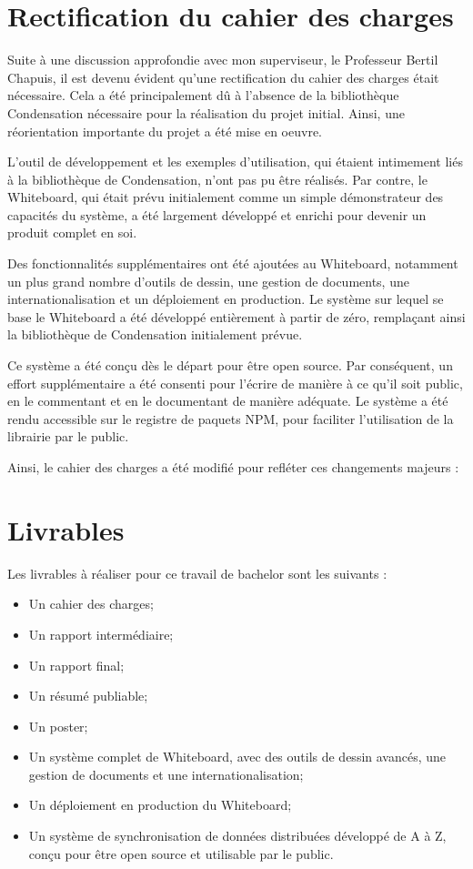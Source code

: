 \section*{Rectification du cahier des charges}

Suite à une discussion approfondie avec mon superviseur, le Professeur Bertil Chapuis, il est devenu évident qu'une rectification du cahier des charges était nécessaire. Cela a été principalement dû à l'absence de la bibliothèque Condensation nécessaire pour la réalisation du projet initial. Ainsi, une réorientation importante du projet a été mise en oeuvre.

L'outil de développement et les exemples d'utilisation, qui étaient intimement liés à la bibliothèque de Condensation, n'ont pas pu être réalisés. Par contre, le Whiteboard, qui était prévu initialement comme un simple démonstrateur des capacités du système, a été largement développé et enrichi pour devenir un produit complet en soi.

Des fonctionnalités supplémentaires ont été ajoutées au Whiteboard, notamment un plus grand nombre d'outils de dessin, une gestion de documents, une internationalisation et un déploiement en production. Le système sur lequel se base le Whiteboard a été développé entièrement à partir de zéro, remplaçant ainsi la bibliothèque de Condensation initialement prévue.

Ce système a été conçu dès le départ pour être open source. Par conséquent, un effort supplémentaire a été consenti pour l'écrire de manière à ce qu'il soit public, en le commentant et en le documentant de manière adéquate. Le système a été rendu accessible sur le registre de paquets NPM, pour faciliter l'utilisation de la librairie par le public.

Ainsi, le cahier des charges a été modifié pour refléter ces changements majeurs :
\section*{Livrables}

Les livrables à réaliser pour ce travail de bachelor sont les suivants :

\begin{itemize}
    \item Un cahier des charges;
    \item Un rapport intermédiaire;
    \item Un rapport final;
    \item Un résumé publiable;
    \item Un poster;
    \item Un système complet de Whiteboard, avec des outils de dessin avancés, une gestion de documents et une internationalisation;
    \item Un déploiement en production du Whiteboard;
    \item Un système de synchronisation de données distribuées développé de A à Z, conçu pour être open source et utilisable par le public.
\end{itemize}

